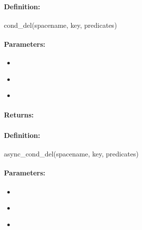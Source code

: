 \paragraph{Definition:}
\begin{rubycode}
cond_del(spacename, key, predicates)
\end{rubycode}

\paragraph{Parameters:}
\begin{itemize}[noitemsep]
\item {}\\

\item {}\\

\item {}\\

\end{itemize}

\paragraph{Returns:}


\pagebreak
\subsubsection{}
\label{api:ruby:async_cond_del}


\paragraph{Definition:}
\begin{rubycode}
async_cond_del(spacename, key, predicates)
\end{rubycode}

\paragraph{Parameters:}
\begin{itemize}[noitemsep]
\item {}\\

\item {}\\

\item {}\\

\end{itemize}

